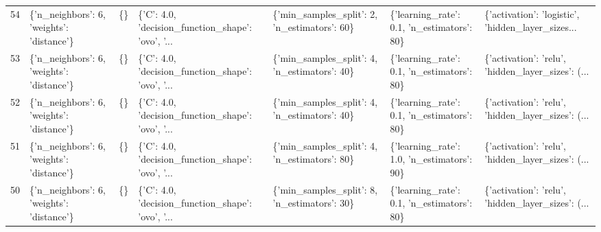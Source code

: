 \begin{tabular}{lllllll}
54  &  \{'n\_neighbors': 6, 'weights': 'distance'\} &  \{\} &  \{'C': 4.0, 'decision\_function\_shape': 'ovo', '... &   \{'min\_samples\_split': 2, 'n\_estimators': 60\} &   \{'learning\_rate': 0.1, 'n\_estimators': 80\} &  \{'activation': 'logistic', 'hidden\_layer\_sizes... \\
53  &  \{'n\_neighbors': 6, 'weights': 'distance'\} &  \{\} &  \{'C': 4.0, 'decision\_function\_shape': 'ovo', '... &   \{'min\_samples\_split': 4, 'n\_estimators': 40\} &   \{'learning\_rate': 0.1, 'n\_estimators': 80\} &  \{'activation': 'relu', 'hidden\_layer\_sizes': (... \\
52  &  \{'n\_neighbors': 6, 'weights': 'distance'\} &  \{\} &  \{'C': 4.0, 'decision\_function\_shape': 'ovo', '... &   \{'min\_samples\_split': 4, 'n\_estimators': 40\} &   \{'learning\_rate': 0.1, 'n\_estimators': 80\} &  \{'activation': 'relu', 'hidden\_layer\_sizes': (... \\
51  &  \{'n\_neighbors': 6, 'weights': 'distance'\} &  \{\} &  \{'C': 4.0, 'decision\_function\_shape': 'ovo', '... &   \{'min\_samples\_split': 4, 'n\_estimators': 80\} &   \{'learning\_rate': 1.0, 'n\_estimators': 90\} &  \{'activation': 'relu', 'hidden\_layer\_sizes': (... \\
50  &  \{'n\_neighbors': 6, 'weights': 'distance'\} &  \{\} &  \{'C': 4.0, 'decision\_function\_shape': 'ovo', '... &   \{'min\_samples\_split': 8, 'n\_estimators': 30\} &   \{'learning\_rate': 0.1, 'n\_estimators': 80\} &  \{'activation': 'relu', 'hidden\_layer\_sizes': (... \\
\bottomrule
\end{tabular}

